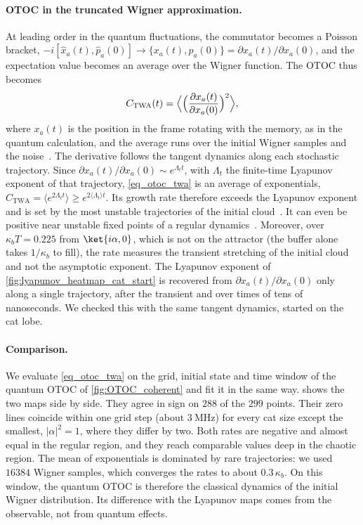 \paragraph*{OTOC in the truncated Wigner approximation.}
At leading order in the quantum fluctuations, the commutator becomes a Poisson bracket, $-i[\hat x_a(t),\hat p_a(0)]\to\{x_a(t),p_a(0)\}=\partial x_a(t)/\partial x_a(0)$, and the expectation value becomes an average over the Wigner function. The OTOC thus becomes
\begin{equation}
    C_\mathrm{TWA}(t)=\Bigl\langle\Bigl(\frac{\partial x_a(t)}{\partial x_a(0)}\Bigr)^2\Bigr\rangle ,
    \label{eq_otoc_twa}
\end{equation}
where $x_a(t)$ is the position in the frame rotating with the memory, as in the quantum calculation, and the average runs over the initial Wigner samples and the noise~\cite{Schmitt2019Apr,Rammensee2018Sep}. The derivative follows the tangent dynamics along each stochastic trajectory. Since $\partial x_a(t)/\partial x_a(0)\sim e^{\Lambda_t t}$, with $\Lambda_t$ the finite-time Lyapunov exponent of that trajectory, \cref{eq_otoc_twa} is an average of exponentials, $C_\mathrm{TWA}=\langle e^{2\Lambda_t t}\rangle\ge e^{2\langle\Lambda_t\rangle t}$. Its growth rate therefore exceeds the Lyapunov exponent and is set by the most unstable trajectories of the initial cloud~\cite{Rozenbaum2017Feb}. It can even be positive near unstable fixed points of a regular dynamics~\cite{Xu2020Apr}. Moreover, over $\kappa_bT=0.225$ from $\ket{i\alpha,0}$, which is not on the attractor (the buffer alone takes $1/\kappa_b$ to fill), the rate measures the transient stretching of the initial cloud and not the asymptotic exponent. The Lyapunov exponent of \cref{fig:lyapunov_heatmap_cat_start} is recovered from $\partial x_a(t)/\partial x_a(0)$ only along a single trajectory, after the transient and over times of tens of nanoseconds. We checked this with the same tangent dynamics, started on the cat lobe.

\paragraph*{Comparison.}
We evaluate \cref{eq_otoc_twa} on the grid, initial state and time window of the quantum OTOC of \cref{fig:OTOC_coherent} and fit it in the same way.  shows the two maps side by side. They agree in sign on $288$ of the $299$ points. Their zero lines coincide within one grid step (about $3~\mathrm{MHz}$) for every cat size except the smallest, $|\alpha|^2=1$, where they differ by two. Both rates are negative and almost equal in the regular region, and they reach comparable values deep in the chaotic region. The mean of exponentials is dominated by rare trajectories: we used $16384$ Wigner samples, which converges the rates to about $0.3\,\kappa_b$. On this window, the quantum OTOC is therefore the classical dynamics of the initial Wigner distribution. Its difference with the Lyapunov maps comes from the observable, not from quantum effects.

